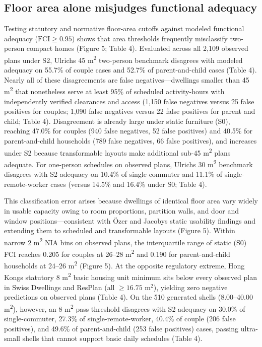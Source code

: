 \documentclass[12pt,letterpaper]{article}
\newcommand{\SubmissionCite}[1]{\unskip\citep{#1}}
\begin{document}
\subsection{Floor area alone misjudges functional adequacy}\label{floor-area-alone-misjudges-functional-adequacy}

Testing statutory and normative floor-area cutoffs against modeled functional adequacy (\(\text{FCI} \ge 0.95\)) shows that area thresholds frequently misclassify two-person compact homes (Figure 5; Table 4). Evaluated across all 2,109 observed plans under S2, Ulrich\textquotesingle s \SubmissionCite{ulrich2025minimum} 45 m\textsuperscript{2} two-person benchmark disagrees with modeled adequacy on 55.7\% of couple cases and 52.7\% of parent-and-child cases (Table 4). Nearly all of these disagreements are false negatives---dwellings smaller than 45 m\textsuperscript{2} that nonetheless serve at least 95\% of scheduled activity-hours with independently verified clearances and access (1,150 false negatives versus 25 false positives for couples; 1,090 false negatives versus 22 false positives for parent and child; Table 4). Disagreement is already large under static furniture (S0), reaching 47.0\% for couples (940 false negatives, 52 false positives) and 40.5\% for parent-and-child households (789 false negatives, 66 false positives), and increases under S2 because transformable layouts make additional sub-45 m\textsuperscript{2} plans adequate. For one-person schedules on observed plans, Ulrich\textquotesingle s 30 m\textsuperscript{2} benchmark disagrees with S2 adequacy on 10.4\% of single-commuter and 11.1\% of single-remote-worker cases (versus 14.5\% and 16.4\% under S0; Table 4).

This classification error arises because dwellings of identical floor area vary widely in usable capacity owing to room proportions, partition walls, and door and window positions---consistent with \"{O}zer and Jacoby\textquotesingle s \SubmissionCite{ozer2022dwelling} static usability findings and extending them to scheduled and transformable layouts (Figure 5). Within narrow 2 m\textsuperscript{2} NIA bins on observed plans, the interquartile range of static (S0) FCI reaches 0.205 for couples at 26--28 m\textsuperscript{2} and 0.190 for parent-and-child households at 24--26 m\textsuperscript{2} (Figure 5). At the opposite regulatory extreme, Hong Kong\textquotesingle s statutory 8 m\textsuperscript{2} basic housing unit minimum sits below every observed plan in Swiss Dwellings and ResPlan (all \(\ge 16.75\text{ m}^2\)), yielding zero negative predictions on observed plans (Table 4). On the 510 generated shells (8.00--40.00 m\textsuperscript{2}), however, an 8 m\textsuperscript{2} pass threshold disagrees with S2 adequacy on 30.0\% of single-commuter, 27.3\% of single-remote-worker, 40.4\% of couple (206 false positives), and 49.6\% of parent-and-child (253 false positives) cases, passing ultra-small shells that cannot support basic daily schedules (Table 4).
\end{document}

